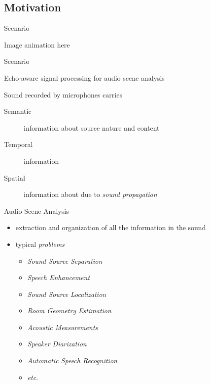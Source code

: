 \subsection{Motivation}

\begin{frame}{Scenario}

    Image animation here

    \begin{block}{Scenario}

    \end{block}

\end{frame}

\begin{frame}{Echo-aware signal processing for \alert{audio scene analysis}}

    \begin{block}{Sound recorded by microphones carries}
        \begin{description}
            \item[Semantic] information about source nature and content
            \item[Temporal] information
            \item[Spatial] information about due to \textit{sound propagation}
        \end{description}
    \end{block}

    \begin{block}{Audio Scene Analysis}
        \begin{itemize}
            \item extraction and organization of all the information in the sound
            \item typical \textit{problems}
            \begin{multicols}{2}
            \begin{itemize}
                \item \alert{\textit{Sound Source Separation}}
                \item \alert{\textit{Speech Enhancement}}
                \item \alert{\textit{Sound Source Localization}}
                \item \alert{\textit{Room Geometry Estimation}}
                \item \textit{Acoustic Measurements}
                \item \textit{Speaker Diarization}
                \item \textit{Automatic Speech Recognition}
                \item \textit{etc}.
            \end{itemize}
            \end{multicols}
        \end{itemize}
    \end{block}

\end{frame}


